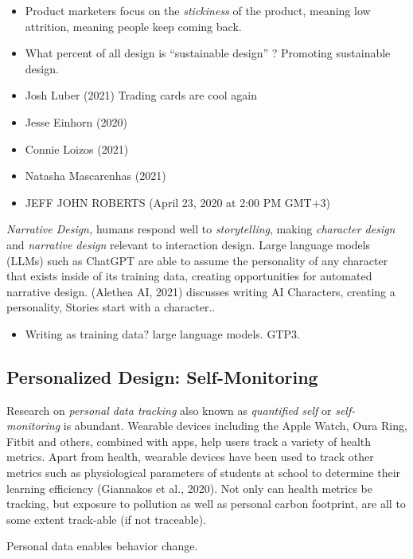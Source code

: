 \documentclass[
  letterpaper,
  DIV=11,
  numbers=noendperiod]{scrartcl}
\providecommand{\tightlist}{%
  \setlength{\itemsep}{0pt}\setlength{\parskip}{0pt}}\usepackage{longtable,booktabs,array}
\begin{document}
\begin{itemize}
\tightlist
\item
  Product marketers focus on the \emph{stickiness} of the product,
  meaning low attrition, meaning people keep coming back.
\item
  What percent of all design is ``sustainable design'' ? Promoting
  sustainable design.
\item
  Josh Luber (2021) Trading cards are cool again
\item
  Jesse Einhorn (2020)
\item
  Connie Loizos (2021)
\item
  Natasha Mascarenhas (2021)
\item
  JEFF JOHN ROBERTS (April 23, 2020 at 2:00 PM GMT+3)
\end{itemize}

\emph{Narrative Design,} humans respond well to \emph{storytelling},
making \emph{character design} and \emph{narrative design} relevant to
interaction design. Large language models (LLMs) such as ChatGPT are
able to assume the personality of any character that exists inside of
its training data, creating opportunities for automated narrative
design. (Alethea AI, 2021) discusses writing AI Characters, creating a
personality, Stories start with a character..

\begin{itemize}
\tightlist
\item
  Writing as training data? large language models. GTP3.
\end{itemize}

\subsection{Personalized Design:
Self-Monitoring}\label{personalized-design-self-monitoring}

Research on \emph{personal data tracking} also known as \emph{quantified
self} or \emph{self-monitoring} is abundant. Wearable devices including
the Apple Watch, Oura Ring, Fitbit and others, combined with apps, help
users track a variety of health metrics. Apart from health, wearable
devices have been used to track other metrics such as physiological
parameters of students at school to determine their learning efficiency
(Giannakos et al., 2020). Not only can health metrics be tracking, but
exposure to pollution as well as personal carbon footprint, are all to
some extent track-able (if not traceable).

Personal data enables behavior change.
\end{document}
